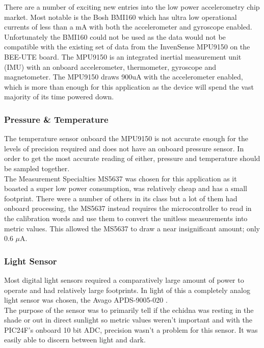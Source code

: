 \documentclass[12pt,openany,a4paper]{book}
\begin{document}
			There are a number of exciting new entries into the low power accelerometry chip market. Most notable is the Bosh BMI160 \cite{bosch15} which has ultra low operational currents of less than a mA with both the accelerometer and gyroscope enabled. \\
			
			Unfortunately the BMI160 could not be used as the data would not be compatible with the existing set of data from the InvenSense MPU9150 \cite{InvenMPU9150} on the BEE-UTE board. The MPU9150 is an integrated inertial measurement unit (IMU) with an onboard accelerometer, thermometer, gyroscope and magnetometer. The MPU9150 draws 900uA with the accelerometer enabled, which is more than enough for this application as the device will spend the vast majority of its time powered down. 
			
			\subsubsection{Pressure \& Temperature}
			The temperature sensor onboard the MPU9150 is not accurate enough for the levels of precision required and does not have an onboard pressure sensor. In order to get the most accurate reading of either, pressure and temperature should be sampled together. \\
			
			The Measurement Specialties MS5637 \cite{MEASPRESSURE} was chosen for this application as it boasted a super low power consumption, was relatively cheap and has a small footprint. There were a number of others in its class but a lot of them had onboard processing, the MS5637 instead requires the microcontroller to read in the calibration words and use them to convert the unitless measurements into metric values. This allowed the MS5637 to draw a near insignificant amount; only 0.6 $\mu$A.
			
			\subsubsection{Light Sensor}
			Most digital light sensors required a comparatively large amount of power to operate and had relatively large footprints. In light of this a completely analog light sensor was chosen, the Avago APDS-9005-020 \cite{AVAGOLIGHT}. \\
			
			The purpose of the sensor was to primarily tell if the echidna was resting in the shade or out in direct sunlight so metric values weren't important and with the PIC24F's onboard 10 bit ADC, precision wasn't a problem for this sensor. It was easily able to discern between light and dark. \\ 
			
\end{document}
